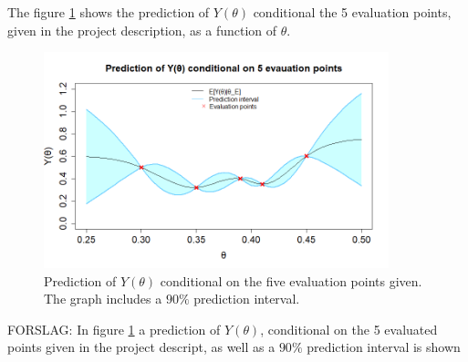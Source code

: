 The figure \ref{2afiveeval} shows the prediction of $Y(\theta)$ conditional the 5 evaluation points, given in the project description, as a function of $\theta$. 

\begin{figure}
    \centering
    \includegraphics[width=100mm]{2aPlot.png}
    \caption{Prediction of $Y(\theta)$ conditional on the five evaluation points given. The graph includes a $90\%$ prediction interval. }
    \label{2afiveeval}
\end{figure}


FORSLAG: In figure \ref{2afiveeval} a prediction of $Y(\theta)$, conditional on the 5 evaluated points given in the project descript, as well as a $90\%$ prediction interval is shown 


